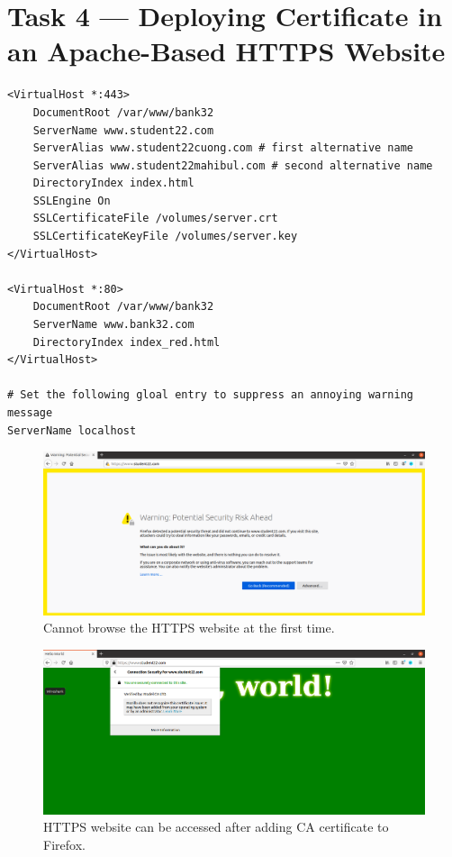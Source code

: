 \section{Task 4 --- Deploying Certificate in an Apache-Based HTTPS Website}
%
\begin{lstlisting}[caption=Content of the {\fontfamily{qcr}\selectfont
    bank32\_apache\_ssl.conf} file., label={lst:server_config}]
<VirtualHost *:443> 
    DocumentRoot /var/www/bank32
    ServerName www.student22.com
    ServerAlias www.student22cuong.com # first alternative name
    ServerAlias www.student22mahibul.com # second alternative name
    DirectoryIndex index.html
    SSLEngine On 
    SSLCertificateFile /volumes/server.crt
    SSLCertificateKeyFile /volumes/server.key
</VirtualHost>

<VirtualHost *:80> 
    DocumentRoot /var/www/bank32
    ServerName www.bank32.com
    DirectoryIndex index_red.html
</VirtualHost>

# Set the following gloal entry to suppress an annoying warning message
ServerName localhost

\end{lstlisting}

\begin{figure}
    \centering
    \includegraphics[height=\textheight,width=\textwidth,keepaspectratio]
    {figures/https_do_not_work.png}
    \caption{Cannot browse the HTTPS website at the first time.}
    \label{fig:https_do_not_work}
\end{figure}

\begin{figure}
    \centering
    \includegraphics[height=\textheight,width=\textwidth,keepaspectratio]
    {figures/https_work.png}
    \caption{HTTPS website can be accessed after adding CA certificate to Firefox.}
    \label{fig:https_work}
\end{figure}


